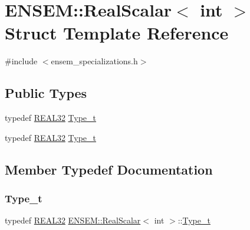 \hypertarget{structENSEM_1_1RealScalar_3_01int_01_4}{}\section{E\+N\+S\+EM\+:\+:Real\+Scalar$<$ int $>$ Struct Template Reference}
\label{structENSEM_1_1RealScalar_3_01int_01_4}


{\ttfamily \#include $<$ensem\+\_\+specializations.\+h$>$}

\subsection*{Public Types}
\begin{DoxyCompactItemize}
\item 
typedef \mbox{\hyperlink{namespaceENSEM_a7540d01191172323e9073283d772576d}{R\+E\+A\+L32}} \mbox{\hyperlink{structENSEM_1_1RealScalar_3_01int_01_4_af4f2f0e6cc881e70e0564b3fe00b8ff7}{Type\+\_\+t}}
\item 
typedef \mbox{\hyperlink{namespaceENSEM_a7540d01191172323e9073283d772576d}{R\+E\+A\+L32}} \mbox{\hyperlink{structENSEM_1_1RealScalar_3_01int_01_4_af4f2f0e6cc881e70e0564b3fe00b8ff7}{Type\+\_\+t}}
\end{DoxyCompactItemize}


\subsection{Member Typedef Documentation}
\mbox{\label{structENSEM_1_1RealScalar_3_01int_01_4_af4f2f0e6cc881e70e0564b3fe00b8ff7}} 
\subsubsection{\texorpdfstring{Type\_t}{Type\_t}\hspace{0.1cm}{\footnotesize\ttfamily [1/2]}}
{\footnotesize\ttfamily typedef \mbox{\hyperlink{namespaceENSEM_a7540d01191172323e9073283d772576d}{R\+E\+A\+L32}} \mbox{\hyperlink{structENSEM_1_1RealScalar}{E\+N\+S\+E\+M\+::\+Real\+Scalar}}$<$ int $>$\+::\mbox{\hyperlink{structENSEM_1_1RealScalar_3_01int_01_4_af4f2f0e6cc881e70e0564b3fe00b8ff7}{Type\+\_\+t}}}

\mbox{\label{structENSEM_1_1RealScalar_3_01int_01_4_af4f2f0e6cc881e70e0564b3fe00b8ff7}} 
